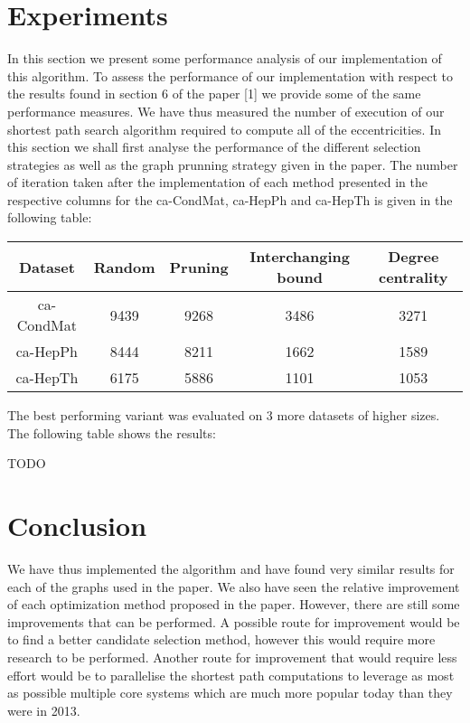 \documentclass[11pt]{article}
\begin{document}
\section{Experiments}
In this section we present some performance analysis of our implementation of
this algorithm. To assess the performance of our implementation with respect to
the results found in section 6 of the paper [1] we provide some of the same
performance measures. We have thus measured the number of execution of our
shortest path search algorithm required to compute all of the eccentricities. In
this section we shall first analyse the performance of the different selection
strategies as well as the graph prunning strategy given in the paper. The number
of iteration taken after the implementation of each method presented in the
respective columns for the ca-CondMat, ca-HepPh and ca-HepTh is given in the
following table:\\
\begin{center}
 \begin{tabular}{||c c c c c||} 
   \hline
   Dataset & Random & Pruning & Interchanging bound & Degree centrality \\
   \hline\hline
   ca-CondMat & 9439 & 9268 & 3486 & 3271 \\ 
   \hline
   ca-HepPh & 8444 & 8211 & 1662 & 1589 \\
   \hline
   ca-HepTh & 6175 & 5886 & 1101 & 1053 \\
   \hline
 \end{tabular}
\end{center}
\medskip
\noindent
The best performing variant was evaluated on 3 more datasets of higher
sizes. The following table shows the results:\\
\begin{tcolorbox}
  \begin{center}
    TODO
  \end{center}
\end{tcolorbox}
\section{Conclusion}
We have thus implemented the algorithm and have found very similar results for
each of the graphs used in the paper. We also have seen the relative improvement
of each optimization method proposed in the paper. However, there are still some
improvements that can be performed. A possible route for improvement would be to
find a better candidate selection method, however this would require more
research to be performed. Another route for improvement that would require less
effort would be to parallelise the shortest path computations to leverage as
most as possible multiple core systems which are much more popular today than
they were in 2013.
\end{document}
